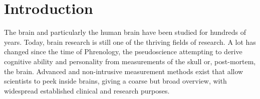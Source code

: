 \documentclass[a4paper, english]{article}
\title{\fontfamily{phv}\selectfont{Causal Discovery methods for Effective Connectivity in Human Brains}}
\author{
  \textbf{R. Janssen} - \href{mailto:ramon.janssen@student.ru.nl}{ramon.janssen@student.ru.nl} \\
  \textbf{T. de Ruijter} - \href{mailto:t.deruijter@student.ru.nl}{t.deruijter@student.ru.nl}\\
  \small Supervised by\\
  \small T. Claassen - \href{mailto:tomc@cs.ru.nl}{tomc@cs.ru.nl}\\
  \small M. Hinne - \href{mailto:mhinne@cs.ru.nl}{mhinne@cs.ru.nl}
}
\date{\fontfamily{ptm}\selectfont{\small{\bfseries{\today - Radboud
Universiteit Nijmegen}}}\\[0.5cm]\rule{\linewidth}{0.3mm}}
\begin{document}
\maketitle

\setlength{\parindent}{0.0cm}
\setlength{\parskip}{3mm plus2mm minus1.5mm}

\begin{abstract}
Many different approaches have been used to infer brain connectivity.
But few general causal discovery methods have yet been used to find effective connectivity.
In this article, we describe how the PC (Peter-Clark) algorithm is used on functional brain-data.
This approach results in connectivity matrices which clearly show some well-known brain connections.
Some disadvantages of the PC algorithm for this use are discussed, and an attempt is made to decrease these disadvantages by making adjustments to the algorithm.
Causal relations have only been found with very low certainty. 
\end{abstract}

\section{Introduction}
The brain and particularly the human brain have been studied for hundreds of years.
Today, brain research is still one of the thriving fields of research.
A lot has changed since the time of Phrenology, the pseudoscience attempting to derive cognitive ability and personality from measurements of the skull or, post-mortem, the brain.
Advanced and non-intrusive measurement methods exist that allow scientists to peek inside brains, giving a coarse but broad overview, with widespread established clinical and research purposes.
\end{document}
